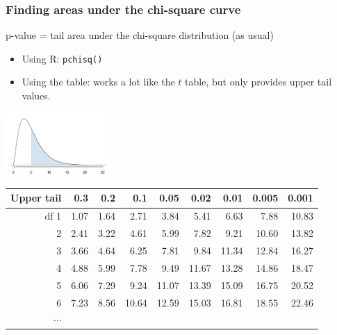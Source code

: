 \documentclass[slidestop,compress,mathserif,12pt,t,professionalfonts,xcolor=table]{beamer}
\begin{document}

\begin{frame}[fragile]
\frametitle{Finding areas under the chi-square curve}

p-value = tail area under the chi-square distribution (as usual)

\pause

\begin{itemize}

%

\item Using R: \texttt{pchisq()}

\pause

\item Using the table: works a lot like the $t$ table, but only provides upper tail values.
\end{itemize}

\begin{center}
\includegraphics[width=0.3\textwidth]{figures/above5Point1WithDF5/above5Point1WithDF5}
\end{center}

{\scriptsize
\begin{center}
\begin{tabular}{r | rrrr | rrrr |}
  \hline
Upper tail & 0.3 & 0.2 & 0.1 & 0.05 & 0.02 & 0.01 & 0.005 & 0.001 \\ 
  \hline
df \hfill 1 &  1.07 &  1.64 &  2.71 &  3.84 &  5.41 &  6.63 &  7.88 &  10.83 \\ 
  2 &  2.41 &  3.22 &  4.61 &  5.99 &  7.82 &  9.21 &  10.60 &  13.82 \\ 
  3 &  3.66 &  4.64 &  6.25 &  7.81 &  9.84 &  11.34 &  12.84 &  16.27 \\ 
  4 &  4.88 &  5.99 &  7.78 &  9.49 &  11.67 &  13.28 &  14.86 &  18.47 \\ 
  5 &  6.06 &  7.29 &  9.24 &  11.07 &  13.39 &  15.09 &  16.75 &  20.52 \\ 
  \hline
  6 &  7.23 &  8.56 &  10.64 &  12.59 &  15.03 &  16.81 &  18.55 &  22.46 \\ 
  $\cdots$ &   &   &   &   &   &   &   &   \\ 
\end{tabular}
\end{center}
}

\end{frame}
\end{document}
